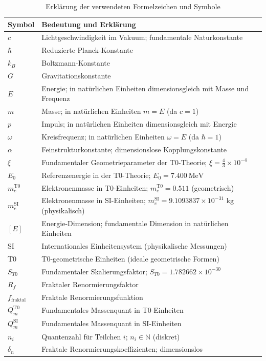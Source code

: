 	\begin{table}[h]
		\centering
		\begin{tabular}{p{3cm}p{10cm}}
			\toprule
			\textbf{Symbol} & \textbf{Bedeutung und Erklärung} \\
			\midrule
			$c$ & Lichtgeschwindigkeit im Vakuum; fundamentale Naturkonstante \\
			$\hbar$ & Reduzierte Planck-Konstante \\
			$k_B$ & Boltzmann-Konstante \\
			$G$ & Gravitationskonstante \\
			$E$ & Energie; in natürlichen Einheiten dimensionsgleich mit Masse und Frequenz \\
			$m$ & Masse; in natürlichen Einheiten $m = E$ (da $c=1$) \\
			$p$ & Impuls; in natürlichen Einheiten dimensionsgleich mit Energie \\
			$\omega$ & Kreisfrequenz; in natürlichen Einheiten $\omega = E$ (da $\hbar=1$) \\
			$\alpha$ & Feinstrukturkonstante; dimensionslose Kopplungskonstante \\
			$\xi$ & Fundamentaler Geometrieparameter der T0-Theorie; $\xi = \frac{4}{3} \times 10^{-4}$ \\
			$E_0$ & Referenzenergie in der T0-Theorie; $E_0 = 7.400~\mathrm{MeV}$ \\
			$m_e^{\mathrm{T0}}$ & Elektronenmasse in T0-Einheiten; $m_e^{\mathrm{T0}} = 0.511$ (geometrisch) \\
			$m_e^{\mathrm{SI}}$ & Elektronenmasse in SI-Einheiten; $m_e^{\mathrm{SI}} = 9.1093837\times 10^{-31}$ kg (physikalisch) \\
			$[E]$ & Energie-Dimension; fundamentale Dimension in natürlichen Einheiten \\
			SI & Internationales Einheitensystem (physikalische Messungen) \\
			T0 & T0-geometrische Einheiten (ideale geometrische Formen) \\
			$S_{T0}$ & Fundamentaler Skalierungsfaktor; $S_{T0} = 1.782662 \times 10^{-30}$ \\
			$R_f$ & Fraktaler Renormierungsfaktor \\
			$f_{\text{fraktal}}$ & Fraktale Renormierungsfunktion \\
			$Q_m^{\mathrm{T0}}$ & Fundamentales Massenquant in T0-Einheiten \\
			$Q_m^{\mathrm{SI}}$ & Fundamentales Massenquant in SI-Einheiten \\
			$n_i$ & Quantenzahl für Teilchen $i$; $n_i \in \mathbb{N}$ (diskret) \\
			$\delta_n$ & Fraktale Renormierungskoeffizienten; dimensionslos \\
			\bottomrule
		\end{tabular}
		\caption{Erklärung der verwendeten Formelzeichen und Symbole}
	\end{table}
	
